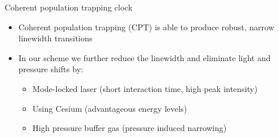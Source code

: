 \begin{block}{Coherent population trapping clock}
  \begin{itemize}
  \item Coherent population trapping (CPT) is able to produce robust, narrow linewidth transitions
  \item In our scheme we further reduce the linewidth and eliminate light and pressure shifts by:
    \begin{itemize}
    \item Mode-locked laser (short interaction time, high peak intensity)
    \item Using Cesium (advantageous energy levels)
    \item High pressure buffer gas (pressure induced narrowing)
    \end{itemize}
  \end{itemize}
\end{block}
